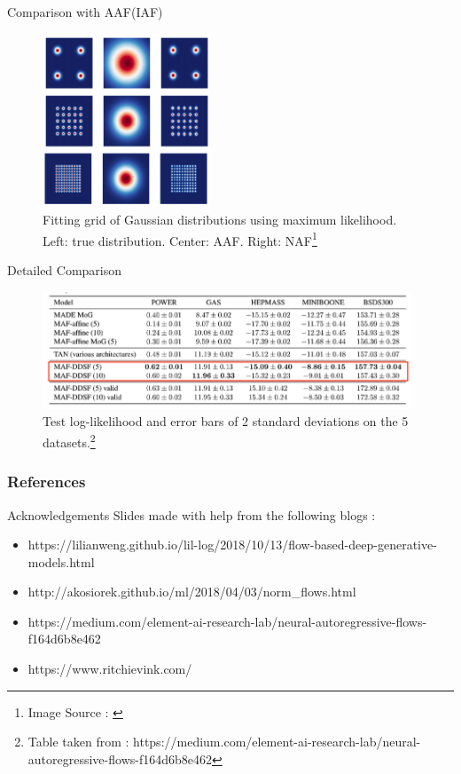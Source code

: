 \documentclass{beamer}
\begin{document}
\begin{frame}{Comparison with AAF(IAF)}
\begin{figure}
    \centering
    \includegraphics[width=50mm,scale=0.5]{naf-result.png}
    \caption{Fitting grid of Gaussian distributions using maximum
likelihood. Left: true distribution. Center: AAF. Right: NAF\footnote{Image Source : \cite{huang2018neural}}}
    \label{fig:naf-result}
\end{figure}
\end{frame}

\begin{frame}{Detailed Comparison}
\begin{figure}
    \centering
    \includegraphics[width=110mm]{naf-table.png}
    \caption{Test log-likelihood and error bars of 2 standard deviations on the 5 datasets.\footnote{Table taken from : https://medium.com/element-ai-research-lab/neural-autoregressive-flows-f164d6b8e462}}
    \label{fig:my_label}
\end{figure}
    
\end{frame}
\begin{frame}[allowframebreaks]
\frametitle{References}



\end{frame}
\begin{frame}{Acknowledgements}
    Slides made with help from the following blogs :
    \begin{itemize}
        \item https://lilianweng.github.io/lil-log/2018/10/13/flow-based-deep-generative-models.html
        \item http://akosiorek.github.io/ml/2018/04/03/norm\_flows.html
        \item https://medium.com/element-ai-research-lab/neural-autoregressive-flows-f164d6b8e462
        \item https://www.ritchievink.com/
    \end{itemize}
\end{frame}
\end{document}
